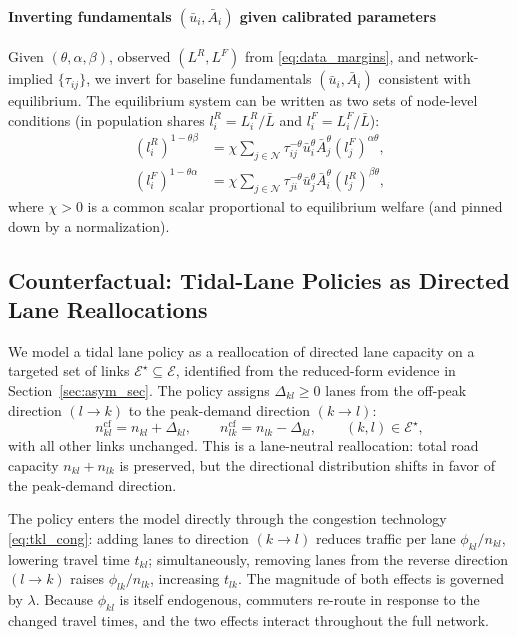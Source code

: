 \documentclass[12pt]{article}
\begin{document}
	\paragraph{Inverting fundamentals $(\bar u_i,\bar A_i)$ given calibrated parameters}
	Given $(\theta,\alpha,\beta)$, observed $(L^R,L^F)$ from \eqref{eq:data_margins}, and network-implied $\{\tau_{ij}\}$, we invert for baseline fundamentals $(\bar u_i,\bar A_i)$ consistent with equilibrium. The equilibrium system can be written as two sets of node-level conditions (in population shares $l_i^R=L_i^R/\bar L$ and $l_i^F=L_i^F/\bar L$):
	\begin{align}
		(l_i^R)^{1-\theta\beta} &= \chi \sum_{j\in\mathcal N}\tau_{ij}^{-\theta}\bar u_i^\theta \bar A_j^\theta (l_j^F)^{\alpha\theta},\label{eq:invert_R}\\
		(l_i^F)^{1-\theta\alpha} &= \chi \sum_{j\in\mathcal N}\tau_{ji}^{-\theta}\bar u_j^\theta \bar A_i^\theta (l_j^R)^{\beta\theta},\label{eq:invert_F}
	\end{align}
	where $\chi>0$ is a common scalar proportional to equilibrium welfare (and pinned down by a normalization). 
	
		\subsection{Counterfactual: Tidal-Lane Policies as Directed Lane Reallocations}

	We model a tidal lane policy as a reallocation of directed lane capacity on a targeted set of links $\mathcal{E}^\star\subseteq\mathcal{E}$, identified from the reduced-form evidence in Section~\ref{sec:asym_sec}. The policy assigns $\Delta_{kl}\geq 0$ lanes from the off-peak direction $(l\to k)$ to the peak-demand direction $(k\to l)$:
	\begin{equation}\label{eq:cf_lanes}
		n_{kl}^{\mathrm{cf}} = n_{kl} + \Delta_{kl},
		\qquad
		n_{lk}^{\mathrm{cf}} = n_{lk} - \Delta_{kl},
		\qquad (k,l)\in\mathcal{E}^\star,
	\end{equation}
	with all other links unchanged. This is a lane-neutral reallocation: total road capacity $n_{kl}+n_{lk}$ is preserved, but the directional distribution shifts in favor of the peak-demand direction.

	The policy enters the model directly through the congestion technology \eqref{eq:tkl_cong}: adding lanes to direction $(k\to l)$ reduces traffic per lane $\phi_{kl}/n_{kl}$, lowering travel time $t_{kl}$; simultaneously, removing lanes from the reverse direction $(l\to k)$ raises $\phi_{lk}/n_{lk}$, increasing $t_{lk}$. The magnitude of both effects is governed by $\lambda$. Because $\phi_{kl}$ is itself endogenous, commuters re-route in response to the changed travel times, and the two effects interact throughout the full network.
\end{document}
